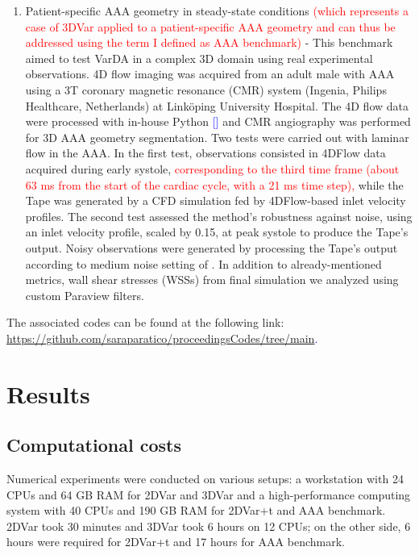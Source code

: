 \begin{enumerate}
    \item Patient-specific AAA geometry in steady-state conditions \textcolor{red}{(which represents a case of 3DVar applied to a patient-specific AAA geometry and can thus be addressed using the term I defined as AAA benchmark)} - This benchmark aimed to test VarDA in a complex 3D domain using real experimental observations. 4D flow imaging was acquired from an adult male with AAA using a 3T coronary magnetic resonance (CMR) system (Ingenia, Philips Healthcare, Netherlands) at Linköping University Hospital. The 4D flow data were processed with in-house Python \textcolor{blue}{[\cite{Saitta2024}]} and CMR angiography was performed for 3D AAA geometry segmentation.
Two tests were carried out with laminar flow in the AAA. In the first test, observations consisted in 4DFlow data acquired during early systole, \textcolor{red}{corresponding to the third time frame (about 63 ms from the start of the cardiac cycle, with a 21 ms time step),} while the Tape was generated by a CFD simulation fed by 4DFlow-based inlet velocity profiles. The second test assessed the method's robustness against noise, using an inlet velocity profile, scaled by 0.15, at peak systole to produce the Tape's output. Noisy observations were generated by processing the Tape's output according to medium noise setting of \cite{Saitta2024}.
In addition to already-mentioned metrics, wall shear stresses (WSSs) from final simulation we analyzed using custom Paraview filters.
\end{enumerate}

The associated codes can be found at the following link:
\textcolor{blue}{\url{https://github.com/saraparatico/proceedingsCodes/tree/main}.}

\section*{Results}
\label{sec:Results}
\label{ch:chapter_three}

\subsection*{Computational costs}
Numerical experiments were conducted on various setups: a workstation with 24 CPUs and 64 GB RAM for 2DVar and 3DVar and a high-performance computing system with 40 CPUs and 190 GB RAM for 2DVar+t and AAA benchmark. 2DVar took 30 minutes and 3DVar took 6 hours on 12 CPUs; on the other side, 6 hours were required for 2DVar+t and 17 hours for AAA benchmark.


